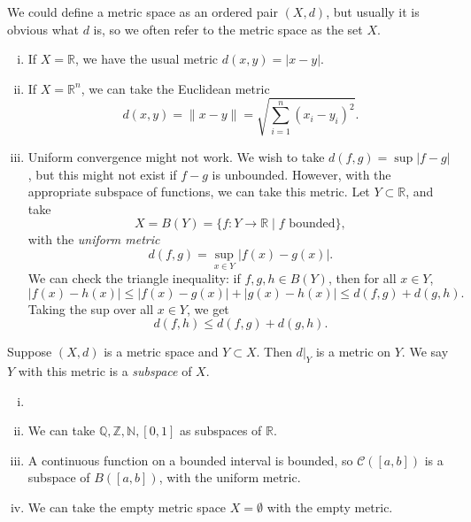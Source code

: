 \documentclass[12pt]{article}
\begin{document}
We could define a metric space as an ordered pair $(X, d)$, but usually it is obvious what $d$ is, so we often refer to the metric space as the set $X$.

\begin{exbox}
	\begin{enumerate}[(i)]
		\item If $X = \mathbb{R}$, we have the usual metric $d(x, y) = |x - y|$.
		\item If $X = \mathbb{R}^{n}$, we can take the Euclidean metric
			\[
				d(x, y) = \|x - y\| = \sqrt{\sum_{i = 1}^{n}(x_{i} - y_i)^2}
			.\]
		\item Uniform convergence might not work. We wish to take $d(f, g) = \sup|f - g|$, but this might not exist if $f - g$ is unbounded. However, with the appropriate subspace of functions, we can take this metric. Let $Y \subset \mathbb{R}$, and take
			\[
				X = B(Y) = \{f : Y \to \mathbb{R} \mid f \text{ bounded}\}
			,\]
			with the \textit{uniform metric}
			\[
				d(f, g) = \sup_{x \in Y}|f(x) - g(x)|
			.\]
			We can check the triangle inequality: if $f, g, h \in B(Y)$, then for all $x \in Y$,
			\[
				|f(x) - h(x)| \leq |f(x) - g(x)| + |g(x) - h(x)| \leq d(f, g) + d(g, h)
			.\]
			Taking the sup over all $x \in Y$, we get
			\[
				d(f, h) \leq d(f, g) + d(g, h)
			.\]
	\end{enumerate}
\end{exbox}

\begin{remark}
	Suppose $(X, d)$ is a metric space and $Y \subset X$. Then $d|_{Y}$ is a metric on $Y$. We say $Y$ with this metric is a \textit{subspace} of $X$.
\end{remark}

\begin{exbox}
	\begin{enumerate}[(i)]
		\item[]
		\item We can take $\mathbb{Q}, \mathbb{Z}, \mathbb{N}, [0, 1]$ as subspaces of $\mathbb{R}$.
		\item A continuous function on a bounded interval is bounded, so $\mathcal{C}([a, b])$ is a subspace of $B([a, b])$, with the uniform metric.
		\item We can take the empty metric space $X = \emptyset$ with the empty metric.
	\end{enumerate}
\end{exbox}
\end{document}

